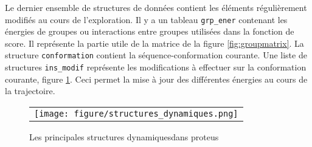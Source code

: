 Le dernier ensemble de structures de données contient les éléments régulièrement modifiés au cours de l'exploration.
Il y a un tableau  \verb!grp_ener! contenant les énergies de groupes ou interactions entre groupes utilisées dans la fonction de score. Il représente la partie utile de la matrice de la figure \ref{fig:groupmatrix}. La structure \verb!conformation! contient la séquence-conformation courante. Une liste de structures \verb!ins_modif! représente les modifications à effectuer sur la conformation courante, figure \ref{fig:structDyna}. Ceci permet la mise à jour des différentes énergies au cours de la trajectoire.   

   \begin{figure}[!htbp]
     \begin{tabular}{c}
       \texttt{[image: figure/structures\_dynamiques.png]} 
     \end{tabular}
     
     \caption{Les principales structures \og dynamiques\fg dans proteus}
\label{fig:structDyna}
   \end{figure}


